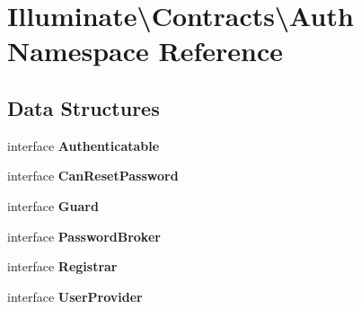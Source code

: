 \section{Illuminate\textbackslash{}Contracts\textbackslash{}Auth Namespace Reference}
\label{namespace_illuminate_1_1_contracts_1_1_auth}
\subsection*{Data Structures}
\begin{DoxyCompactItemize}
\item 
interface {\bf Authenticatable}
\item 
interface {\bf Can\+Reset\+Password}
\item 
interface {\bf Guard}
\item 
interface {\bf Password\+Broker}
\item 
interface {\bf Registrar}
\item 
interface {\bf User\+Provider}
\end{DoxyCompactItemize}
